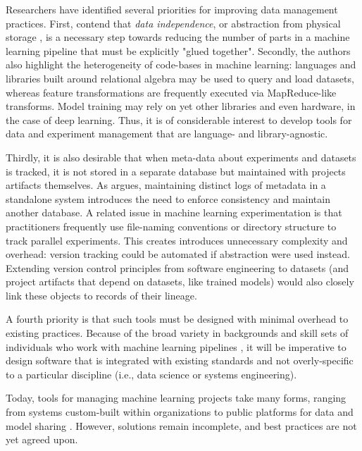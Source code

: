 \documentclass[10pt,sigconf, authordraft]{acmart}
\begin{document}
Researchers have identified several priorities for improving data management practices. First, \citet{Schelter2018OnManagement} contend that \textit{data independence}, or abstraction from physical storage \cite{Tsatalos1996TheIndependence}, is a necessary step towards reducing the number of parts in a machine learning pipeline that must be explicitly "glued together". Secondly, the authors also highlight the heterogeneity of code-bases in machine learning: languages and libraries built around relational algebra may be used to query and load datasets, whereas feature transformations are frequently executed via MapReduce-like transforms. Model training may rely on yet other libraries and even hardware, in the case of deep learning. Thus, it is of considerable interest to develop tools for data and experiment management that are language- and library-agnostic. 

Thirdly, it is also desirable that when meta-data about experiments and datasets is tracked, it is not stored in a separate database but maintained with projects artifacts themselves. As \citet{Muniswamy-Reddy2006Provenance-awareSystems} argues, maintaining distinct logs of metadata in a standalone system introduces the need to enforce consistency and maintain another database. A related issue in machine learning experimentation is that practitioners frequently use file-naming conventions or directory structure to track parallel experiments\cite{Gharibi2019AutomatedExperiments}. This creates introduces unnecessary complexity and overhead: version tracking could be automated if abstraction were used instead. Extending version control principles from software engineering to datasets (and project artifacts that depend on datasets, like trained models) would also closely link these objects to records of their lineage. 

A fourth priority is that such tools must be designed with minimal overhead to existing practices. Because of the broad variety in backgrounds and skill sets of individuals who work with machine learning pipelines \cite{Amershi2019SoftwareStudy,Halevy2016Goods:Datasets,Schelter2018OnManagement}, it will be imperative to design software that is integrated with existing standards and not overly-specific to a particular discipline (i.e., data science or systems engineering). 

Today, tools for managing machine learning projects take many forms, ranging from systems custom-built within organizations \cite{Halevy2016Goods:Datasets} to public platforms for data and model sharing \cite{Bhardwaj2015DataHub:Scale,Gharibi2019ModelKB:Learning,Vartak2016ModelDB:Management,Miao2017ModelManagement}. However, solutions remain incomplete, and best practices are not yet agreed upon. 
\end{document}
